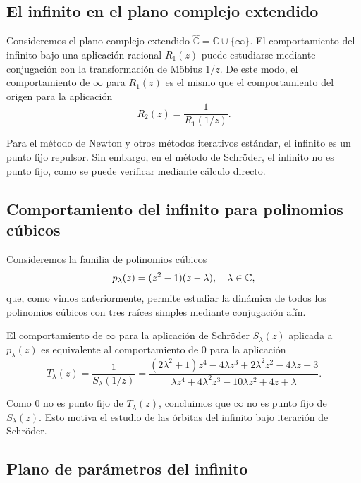 \subsection{El infinito en el plano complejo extendido}

Consideremos el plano complejo extendido $\hat{\mathbb{C}}=\mathbb{C}\cup\{\infty\}$. El comportamiento del infinito bajo una aplicación racional $R_1(z)$ puede estudiarse mediante conjugación con la transformación de Möbius $1/z$. De este modo, el comportamiento de $\infty$ para $R_1(z)$ es el mismo que el comportamiento del origen para la aplicación
$$
R_2(z)=\frac{1}{R_1(1/z)}.
$$

Para el método de Newton y otros métodos iterativos estándar, el infinito es un punto fijo repulsor. Sin embargo, en el método de Schröder, el infinito no es punto fijo, como se puede verificar mediante cálculo directo.

\subsection{Comportamiento del infinito para polinomios cúbicos}

Consideremos la familia de polinomios cúbicos
\begin{equation}
p_\lambda(z)=(z^2-1)(z-\lambda), \quad \lambda\in\mathbb{C},
\label{eq:familia_cubica_inf}
\end{equation}
que, como vimos anteriormente, permite estudiar la dinámica de todos los polinomios cúbicos con tres raíces simples mediante conjugación afín.

El comportamiento de $\infty$ para la aplicación de Schröder $S_\lambda(z)$ aplicada a $p_\lambda(z)$ es equivalente al comportamiento de $0$ para la aplicación
\begin{equation}
T_\lambda(z)=\frac{1}{S_\lambda(1/z)}=\frac{(2\lambda^2+1)z^4-4\lambda z^3+2\lambda^2 z^2-4\lambda z+3}{\lambda z^4+4\lambda^2 z^3-10\lambda z^2+4z+\lambda}.
\label{eq:T_lambda_inf}
\end{equation}

Como $0$ no es punto fijo de $T_\lambda(z)$, concluimos que $\infty$ no es punto fijo de $S_\lambda(z)$. Esto motiva el estudio de las órbitas del infinito bajo iteración de Schröder.

\subsection{Plano de parámetros del infinito}

